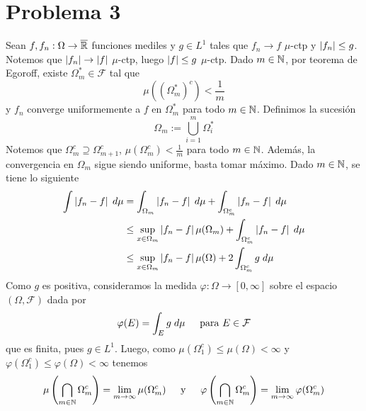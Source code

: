\documentclass{article}
\begin{document}
\section*{Problema 3}
\noindent Sean $f,f_{n}:\Omega\to\overline{\mathbb{R}}$ funciones mediles y $g\in L^{1}$ tales que $f_{n}
\to f$ $\mu$-ctp y $\left|f_{n} \right|\leq g$. Notemos que $\left|f_{n} \right|\to\left|f \right|$ $\mu$-ctp, luego 
$\left|f \right|\leq g$ $\mu$-ctp. Dado $m\in\mathbb{N}$, por teorema de Egoroff, existe $\Omega_{m}^{*}\in
\mathcal{F}$ tal que
\begin{equation*}
    \mu((\Omega_{m}^{*})^{c})<\frac{1}{m}
\end{equation*}
y $f_{n}$ converge uniformemente a $f$ en $\Omega_{m}^{*}$ para todo $m\in\mathbb{N}$. 
Definimos la sucesión
\begin{equation*}
    \Omega_{m}:=\bigcup_{i=1}^{m}\Omega_{i}^{*}
\end{equation*}
Notemos que $\Omega_{m}^{c}\supseteq\Omega_{m+1}^{c}$, $\mu(\Omega_{m}^{c})<\frac{1}{m}$ para todo 
$m\in\mathbb{N}$. Además, la convergencia en $\Omega_{m}$ sigue siendo uniforme, basta tomar máximo. 
Dado $m\in\mathbb{N}$, se tiene lo siguiente
\begin{align*}
    \int\left|f_{n}-f \right|\hspace{1mm}d\mu &= \int_{\Omega_{m}}\left|f_{n}-f \right|\hspace{1mm}d\mu+
    \int_{\Omega_{m}^{c}}\left|f_{n}-f \right|\hspace{1mm}d\mu \\
    &\leq \sup_{x\in\Omega_{m}}\left|f_{n}-f \right|\mu(\Omega_{m})
    +\int_{\Omega_{m}^{c}}\left|f_{n}-f \right|\hspace{1mm}d\mu \\
    &\leq \sup_{x\in\Omega_{m}}\left|f_{n}-f \right|\mu(\Omega)
    +2\int_{\Omega_{m}^{c}}g\hspace{1mm}d\mu
\end{align*}
Como $g$ es positiva, consideramos la medida $\varphi:\Omega\to[0,\infty]$ sobre el espacio 
$(\Omega, \mathcal{F})$ dada por
\begin{equation*}
    \varphi(E)=\int_{E}g\hspace{1mm}d\mu\hspace{4mm}\text{ para }E\in\mathcal{F}
\end{equation*}
que es finita, pues $g\in L^{1}$. Luego, como $\mu(\Omega_{1}^{c})\leq\mu(\Omega)<\infty$ y
$\varphi(\Omega_{1}^{c})\leq\varphi(\Omega)<\infty$ tenemos
\begin{equation*}
    \mu\left(\bigcap_{m\in\mathbb{N}}\Omega_{m}^{c}\right)=\lim\limits_{m\to\infty}\mu(\Omega_{m}^{c})
    \hspace{4mm}\text{ y }\hspace{4mm}
    \varphi\left(\bigcap_{m\in\mathbb{N}}\Omega_{m}^{c}\right)=\lim\limits_{m\to\infty}
    \varphi(\Omega_{m}^{c})
\end{equation*}
\end{document}
